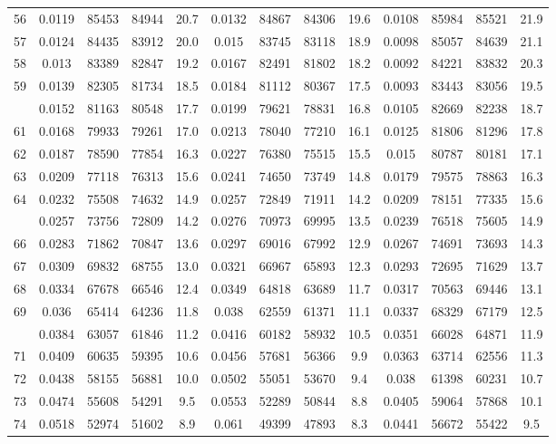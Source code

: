 \documentclass[
  14pt,
]{article}
\begin{document}
\begin{longtable}[t]{lcccccccccccc}
56 & 0.0119 & 85453 & 84944 & 20.7 & 0.0132 & 84867 & 84306 & 19.6 & 0.0108 & 85984 & 85521 & 21.9\\
57 & 0.0124 & 84435 & 83912 & 20.0 & 0.015 & 83745 & 83118 & 18.9 & 0.0098 & 85057 & 84639 & 21.1\\
58 & 0.013 & 83389 & 82847 & 19.2 & 0.0167 & 82491 & 81802 & 18.2 & 0.0092 & 84221 & 83832 & 20.3\\
59 & 0.0139 & 82305 & 81734 & 18.5 & 0.0184 & 81112 & 80367 & 17.5 & 0.0093 & 83443 & 83056 & 19.5\\
\addlinespace
60 & 0.0152 & 81163 & 80548 & 17.7 & 0.0199 & 79621 & 78831 & 16.8 & 0.0105 & 82669 & 82238 & 18.7\\
61 & 0.0168 & 79933 & 79261 & 17.0 & 0.0213 & 78040 & 77210 & 16.1 & 0.0125 & 81806 & 81296 & 17.8\\
62 & 0.0187 & 78590 & 77854 & 16.3 & 0.0227 & 76380 & 75515 & 15.5 & 0.015 & 80787 & 80181 & 17.1\\
63 & 0.0209 & 77118 & 76313 & 15.6 & 0.0241 & 74650 & 73749 & 14.8 & 0.0179 & 79575 & 78863 & 16.3\\
64 & 0.0232 & 75508 & 74632 & 14.9 & 0.0257 & 72849 & 71911 & 14.2 & 0.0209 & 78151 & 77335 & 15.6\\
\addlinespace
65 & 0.0257 & 73756 & 72809 & 14.2 & 0.0276 & 70973 & 69995 & 13.5 & 0.0239 & 76518 & 75605 & 14.9\\
66 & 0.0283 & 71862 & 70847 & 13.6 & 0.0297 & 69016 & 67992 & 12.9 & 0.0267 & 74691 & 73693 & 14.3\\
67 & 0.0309 & 69832 & 68755 & 13.0 & 0.0321 & 66967 & 65893 & 12.3 & 0.0293 & 72695 & 71629 & 13.7\\
68 & 0.0334 & 67678 & 66546 & 12.4 & 0.0349 & 64818 & 63689 & 11.7 & 0.0317 & 70563 & 69446 & 13.1\\
69 & 0.036 & 65414 & 64236 & 11.8 & 0.038 & 62559 & 61371 & 11.1 & 0.0337 & 68329 & 67179 & 12.5\\
\addlinespace
70 & 0.0384 & 63057 & 61846 & 11.2 & 0.0416 & 60182 & 58932 & 10.5 & 0.0351 & 66028 & 64871 & 11.9\\
71 & 0.0409 & 60635 & 59395 & 10.6 & 0.0456 & 57681 & 56366 & 9.9 & 0.0363 & 63714 & 62556 & 11.3\\
72 & 0.0438 & 58155 & 56881 & 10.0 & 0.0502 & 55051 & 53670 & 9.4 & 0.038 & 61398 & 60231 & 10.7\\
73 & 0.0474 & 55608 & 54291 & 9.5 & 0.0553 & 52289 & 50844 & 8.8 & 0.0405 & 59064 & 57868 & 10.1\\
74 & 0.0518 & 52974 & 51602 & 8.9 & 0.061 & 49399 & 47893 & 8.3 & 0.0441 & 56672 & 55422 & 9.5\\

\end{longtable}
\end{document}
